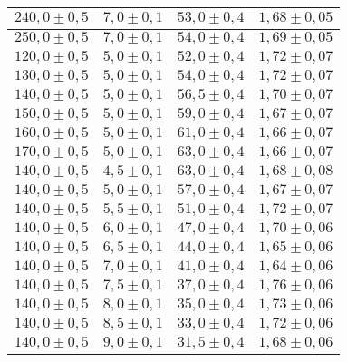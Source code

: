 \documentclass[12pt,a4paper,titlepage,headinclude,bibtotoc]{scrartcl}
\begin{document}
\begin{table}[h!]
\begin{tabular}{|l|l|l|l|}
		 \hline                         
		 $240,0 \pm 0,5$ & $7,0 \pm 0,1$& $53,0 \pm 0,4$ & $1,68 \pm 0,05$\\
		 \hline                         
		 $250,0 \pm 0,5$ & $7,0 \pm 0,1$& $54,0 \pm 0,4$ & $1,69 \pm 0,05$\\
		 \hline                         
		 $120,0 \pm 0,5$ & $5,0 \pm 0,1$& $52,0 \pm 0,4$ & $1,72 \pm 0,07$\\
		 \hline                         
		 $130,0 \pm 0,5$ & $5,0 \pm 0,1$& $54,0 \pm 0,4$ & $1,72 \pm 0,07$\\
		 \hline                         
		 $140,0 \pm 0,5$ & $5,0 \pm 0,1$& $56,5 \pm 0,4$ & $1,70 \pm 0,07$\\
		 \hline                         
		 $150,0 \pm 0,5$ & $5,0 \pm 0,1$& $59,0 \pm 0,4$ & $1,67 \pm 0,07$\\
		 \hline                         
		 $160,0 \pm 0,5$ & $5,0 \pm 0,1$& $61,0 \pm 0,4$ & $1,66 \pm 0,07$\\
		 \hline                         
		 $170,0 \pm 0,5$ & $5,0 \pm 0,1$& $63,0 \pm 0,4$ & $1,66 \pm 0,07$\\
		 \hline                         
		 $140,0 \pm 0,5$ & $4,5 \pm 0,1$& $63,0 \pm 0,4$ & $1,68 \pm 0,08$\\
		 \hline                         
		 $140,0 \pm 0,5$ & $5,0 \pm 0,1$& $57,0 \pm 0,4$ & $1,67 \pm 0,07$\\
		 \hline                         
		 $140,0 \pm 0,5$ & $5,5 \pm 0,1$& $51,0 \pm 0,4$ & $1,72 \pm 0,07$\\
		 \hline                         
		 $140,0 \pm 0,5$ & $6,0 \pm 0,1$& $47,0 \pm 0,4$ & $1,70 \pm 0,06$\\
		 \hline                         
		 $140,0 \pm 0,5$ & $6,5 \pm 0,1$& $44,0 \pm 0,4$ & $1,65 \pm 0,06$\\
		 \hline                         
		 $140,0 \pm 0,5$ & $7,0 \pm 0,1$& $41,0 \pm 0,4$ & $1,64 \pm 0,06$\\
		 \hline                         
		 $140,0 \pm 0,5$ & $7,5 \pm 0,1$& $37,0 \pm 0,4$ & $1,76 \pm 0,06$\\
		 \hline                         
		 $140,0 \pm 0,5$ & $8,0 \pm 0,1$& $35,0 \pm 0,4$ & $1,73 \pm 0,06$\\
		 \hline                         
		 $140,0 \pm 0,5$ & $8,5 \pm 0,1$& $33,0 \pm 0,4$ & $1,72 \pm 0,06$\\
		 \hline                         
		 $140,0 \pm 0,5$ & $9,0 \pm 0,1$& $31,5 \pm 0,4$ & $1,68 \pm 0,06$\\

\end{tabular}
\end{table}
\end{document}
